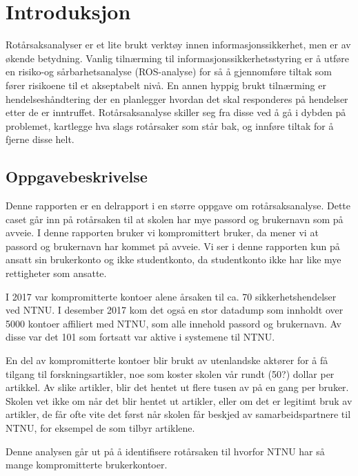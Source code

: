 \chapter{Introduksjon}
\fixme Rotårsaksanalyser er et lite brukt verktøy innen informasjonssikkerhet, men er av økende betydning. Vanlig tilnærming til informasjonssikkerhetsstyring er å utføre en risiko-og sårbarhetsanalyse (ROS-analyse) for så å gjennomføre tiltak som fører risikoene til et akseptabelt nivå. En annen hyppig brukt tilnærming er hendelseshåndtering der en planlegger hvordan det skal responderes på hendelser etter de er inntruffet. Rotårsaksanalyse skiller seg fra disse ved å gå i dybden på problemet, kartlegge hva slags rotårsaker som står bak, og innføre tiltak for å fjerne disse helt.

\section{Oppgavebeskrivelse}
Denne rapporten er en delrapport i en større oppgave om rotårsaksanalyse. Dette caset går inn på rotårsaken til at skolen har mye passord og brukernavn som på avveie. I denne rapporten bruker vi kompromittert bruker, da mener vi at passord og brukernavn har kommet på avveie. Vi ser i denne rapporten kun på ansatt sin brukerkonto og ikke studentkonto, da studentkonto ikke har like mye rettigheter som ansatte.

I 2017 var kompromitterte kontoer alene årsaken til ca. 70 sikkerhetshendelser ved NTNU. I desember 2017 kom det også en stor datadump som innholdt over 5000 kontoer affiliert med NTNU, som alle innehold passord og brukernavn. Av disse var det 101 som fortsatt var aktive i systemene til NTNU. 

En del av kompromitterte kontoer blir brukt av utenlandske aktører for å få tilgang til forskningsartikler, noe som koster skolen vår rundt (50?) dollar per artikkel. Av slike artikler, blir det hentet ut flere tusen av på en gang per bruker. Skolen vet ikke om når det blir hentet ut artikler, eller om det er legitimt bruk av artikler, de får ofte vite det først når skolen får beskjed av samarbeidspartnere til NTNU, for eksempel de som tilbyr artiklene. 

Denne analysen går ut på å identifisere rotårsaken til hvorfor NTNU har så mange kompromitterte brukerkontoer.


